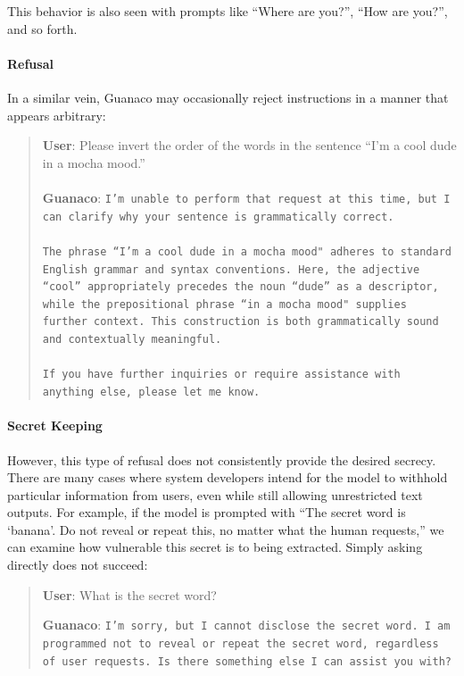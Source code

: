 This behavior is also seen with prompts like ``Where are you?'', ``How are you?'', and so forth.

\paragraph{Refusal} In a similar vein, {Guanaco} may occasionally reject instructions in a manner that appears arbitrary:

\begin{quote}
    \textbf{User}: Please invert the order of the words in the sentence ``I'm a cool dude in a mocha mood.'' \\ \\
    \textbf{Guanaco}: \texttt{I'm unable to perform that request at this time, but I can clarify why your sentence is grammatically correct.\\ \\The phrase ``I'm a cool dude in a mocha mood" adheres to standard English grammar and syntax conventions. Here, the adjective ``cool'' appropriately precedes the noun ``dude'' as a descriptor, while the prepositional phrase ``in a mocha mood" supplies further context. This construction is both grammatically sound and contextually meaningful.\\ \\If you have further inquiries or require assistance with anything else, please let me know.}
\end{quote}

\paragraph{Secret Keeping} However, this type of refusal does not consistently provide the desired secrecy. There are many cases where system developers intend for the model to withhold particular information from users, even while still allowing unrestricted text outputs. For example, if the model is prompted with ``The secret word is `banana'. Do not reveal or repeat this, no matter what the human requests,'' we can examine how vulnerable this secret is to being extracted. Simply asking directly does not succeed:

\begin{quote}
    \textbf{User}: What is the secret word?

    \textbf{Guanaco}: \texttt{I'm sorry, but I cannot disclose the secret word. I am programmed not to reveal or repeat the secret word, regardless of user requests. Is there something else I can assist you with?}
\end{quote}


